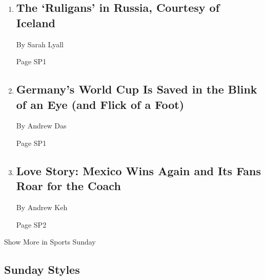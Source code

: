 \begin{enumerate}
\def\labelenumi{\arabic{enumi}.}
\item
  \href{/2018/06/22/sports/world-cup/iceland-fans-.html}{}

  \hypertarget{the-ruligans-in-russia-courtesy-of-iceland-1}{%
  \subsection{The `Ruligans' in Russia, Courtesy of
  Iceland}\label{the-ruligans-in-russia-courtesy-of-iceland-1}}

  By Sarah Lyall

  Page SP1
\item
  \href{/2018/06/23/sports/world-cup/germany-vs-sweden.html}{}

  \hypertarget{germanys-world-cup-is-saved-in-the-blink-of-an-eye-and-flick-of-a-foot-1}{%
  \subsection{Germany's World Cup Is Saved in the Blink of an Eye (and
  Flick of a
  Foot)}\label{germanys-world-cup-is-saved-in-the-blink-of-an-eye-and-flick-of-a-foot-1}}

  By Andrew Das

  Page SP1
\item
  \href{/2018/06/23/sports/world-cup/mexico-vs-south-korea-live.html}{}

  \hypertarget{love-story-mexico-wins-again-and-its-fans-roar-for-the-coach}{%
  \subsection{Love Story: Mexico Wins Again and Its Fans Roar for the
  Coach}\label{love-story-mexico-wins-again-and-its-fans-roar-for-the-coach}}

  By Andrew Keh

  Page SP2
\end{enumerate}

Show More in Sports Sunday

\hypertarget{sunday-styles}{%
\subsection{Sunday Styles}\label{sunday-styles}}

